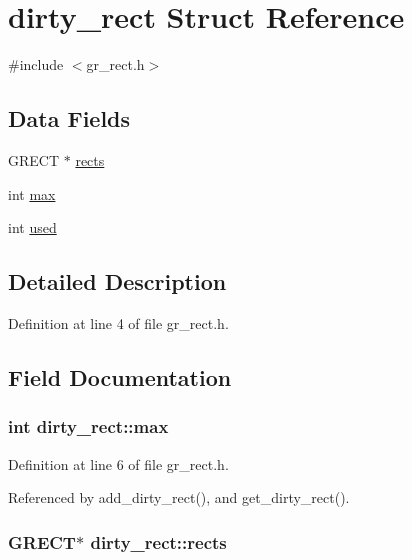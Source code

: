 \hypertarget{structdirty__rect}{\section{dirty\+\_\+rect Struct Reference}
\label{structdirty__rect}
}


{\ttfamily \#include $<$gr\+\_\+rect.\+h$>$}

\subsection*{Data Fields}
\begin{DoxyCompactItemize}
\item 
G\+R\+E\+C\+T $\ast$ \hyperlink{structdirty__rect_ab889243f2328956531a30bb3a01ac8e4}{rects}
\item 
int \hyperlink{structdirty__rect_ab03dbe7d4c0d1b17671721e81998a6f8}{max}
\item 
int \hyperlink{structdirty__rect_a67a9616d0e36086f65c7bf272fc3ebe4}{used}
\end{DoxyCompactItemize}


\subsection{Detailed Description}


Definition at line 4 of file gr\+\_\+rect.\+h.



\subsection{Field Documentation}
\hypertarget{structdirty__rect_ab03dbe7d4c0d1b17671721e81998a6f8}{
\subsubsection[{max}]{\setlength{\rightskip}{0pt plus 5cm}int dirty\+\_\+rect\+::max}}\label{structdirty__rect_ab03dbe7d4c0d1b17671721e81998a6f8}


Definition at line 6 of file gr\+\_\+rect.\+h.



Referenced by add\+\_\+dirty\+\_\+rect(), and get\+\_\+dirty\+\_\+rect().

\hypertarget{structdirty__rect_ab889243f2328956531a30bb3a01ac8e4}{
\subsubsection[{rects}]{\setlength{\rightskip}{0pt plus 5cm}G\+R\+E\+C\+T$\ast$ dirty\+\_\+rect\+::rects}}\label{structdirty__rect_ab889243f2328956531a30bb3a01ac8e4}


